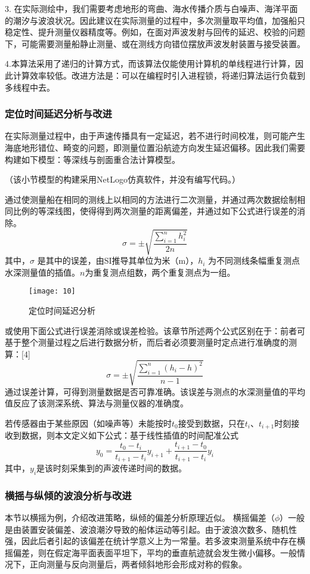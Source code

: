 \documentclass[withoutpreface,bwprint]{cumcmthesis} %
\begin{document}
3. 在实际测绘中，我们需要考虑地形的弯曲、海水传播介质与白噪声、海洋平面的潮汐与波浪状况。因此建议在实际测量的过程中，多次测量取平均值，加强船只稳定性、提升测量仪器精度等。例如，在面对声波发射与回传的延迟、校验的问题下，可能需要测量船静止测量、或在测线方向错位摆放声波发射装置与接受装置。

4.本算法采用了递归的计算方式，而该算法仅能使用计算机的单线程进行计算，因此计算效率较低。改进方法是：可以在编程时引入进程锁，将递归算法运行负载到多线程中去。

\subsubsection{定位时间延迟分析与改进}
在实际测量过程中，由于声速传播具有一定延迟，若不进行时间校准，则可能产生海底地形错位、畸变的问题，即测量位置沿航迹方向发生延迟偏移。因此我们需要构建如下模型：等深线与剖面重合法计算模型。

（该小节模型的构建采用NetLogo仿真软件，并没有编写代码。）

通过使测量船在相同的测线上以相同的方法进行二次测量，并通过两次数据绘制相同比例的等深线图，使得得到两次测量的距离偏差，并通过如下公式进行误差的消除。
\begin{equation}
\sigma=\pm\sqrt{\frac{\sum_{i=1}^{n}{h_i^2}}{2n}}
\end{equation}
其中，$\sigma$ 是其中的误差，由SI推导其单位为米（m），$h_i$ 为不同测线条幅重复测点水深测量值的插值。$n$为重复测点组数，两个重复测点为一组。
\begin{figure}[H]
    \centering
    \texttt{[image: 10]}
    \caption{定位时间延迟分析}
    \label{fig:four}
\end{figure}
或使用下面公式进行误差消除或误差检验。该章节所述两个公式区别在于：前者可基于整个测量过程之后进行数据分析，而后者必须要测量时定点进行准确度的测算：[4]
\begin{equation}
\sigma=\pm\sqrt{\frac{\sum_{i=1}^{n}{(h_i-h)}^2}{n-1}}
\end{equation}
通过误差计算，可得到测量数据是否可靠准确。该误差与测点的水深测量值的平均值反应了该测深系统、算法与测量仪器的准确度。

若传感器由于某些原因（如噪声等）未能按时$t_0$接受到数据，只在$t_i$、$t_{i+1}$时刻接收到数据，则本文定义如下公式：基于线性插值的时间配准公式
\begin{equation}
y_0=\frac{t_0-t_i}{t_{i+1}-t_i}y_{i+1}+\frac{t_{i+1}-t_0}{t_{i+1}-t_i}y_i
\end{equation}
其中，$y_i$是该时刻采集到的声波传递时间的数据。
\subsubsection{横摇与纵倾的波浪分析与改进}
本节以横摇为例，介绍改进策略，纵倾的偏差分析原理近似。
横摇偏差（$\phi$）一般是由装置安装偏差、波浪潮汐导致的船体运动等引起。由于波浪次数多、随机性强，因此后者引起的该偏差在统计学意义上为一常量。若多波束测量系统中存在横摇偏差，则在假定海平面表面平坦下，平均的垂直航迹就会发生微小偏移。一般情况下，正向测量与反向测量后，两者倾斜地形会形成对称的假象。
\end{document}
